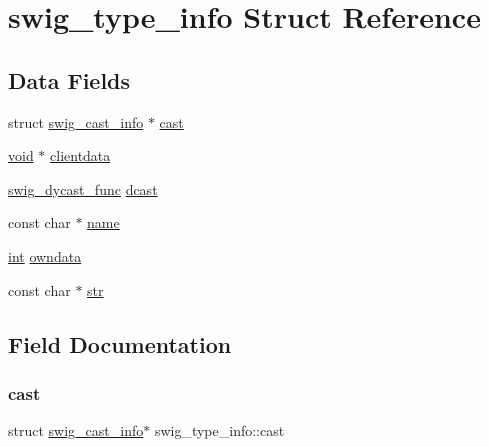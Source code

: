 \hypertarget{structswig__type__info}{}\section{swig\+\_\+type\+\_\+info Struct Reference}
\label{structswig__type__info}
\subsection*{Data Fields}
\begin{DoxyCompactItemize}
\item 
struct \hyperlink{structswig__cast__info}{swig\+\_\+cast\+\_\+info} $\ast$ \hyperlink{structswig__type__info_a3ee3f7ef20e965b6c798d79723a96f9b}{cast}
\item 
\hyperlink{lp__lib_8h_ac7828c7b2b31d2e11af17bdb6289c5d9}{void} $\ast$ \hyperlink{structswig__type__info_a19bdd65dceb89cd54befd3ded06558b7}{clientdata}
\item 
\hyperlink{libstructural__wrap__python_8cpp_aee981c41d733723d60337a77630106af}{swig\+\_\+dycast\+\_\+func} \hyperlink{structswig__type__info_a07df4bedf85be77b23756b531b60e0dd}{dcast}
\item 
const char $\ast$ \hyperlink{structswig__type__info_a90a9c6a25aa3e923978005ecbe23ad60}{name}
\item 
\hyperlink{lp__lib_8h_adeb9ec6400320e4923ac9d836d509ddb}{int} \hyperlink{structswig__type__info_a93c25d5903cbfcb82208eea7227c32bd}{owndata}
\item 
const char $\ast$ \hyperlink{structswig__type__info_abbe7cc58a083feb4329b748643324064}{str}
\end{DoxyCompactItemize}


\subsection{Field Documentation}
\mbox{\label{structswig__type__info_a3ee3f7ef20e965b6c798d79723a96f9b}} 
\subsubsection{\texorpdfstring{cast}{cast}}
{\footnotesize\ttfamily struct \hyperlink{structswig__cast__info}{swig\+\_\+cast\+\_\+info}$\ast$ swig\+\_\+type\+\_\+info\+::cast}

